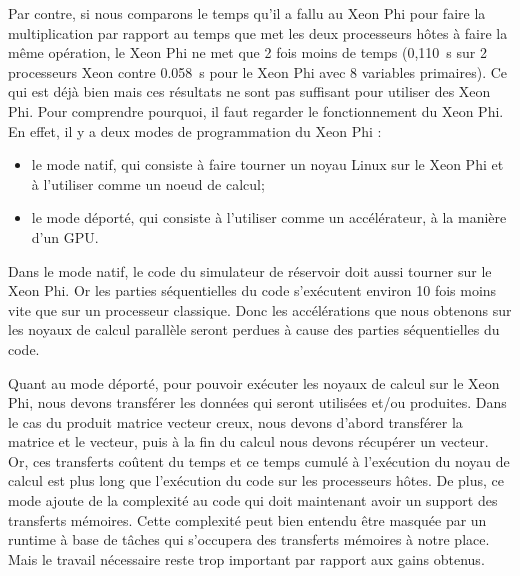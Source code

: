 Par contre, si nous comparons le temps qu'il a fallu au Xeon Phi pour faire la multiplication par rapport au temps que met les deux processeurs hôtes à faire la même opération, le Xeon Phi ne met que 2 fois moins de temps (0,110~s sur 2 processeurs Xeon contre 0.058~s pour le Xeon Phi avec 8 variables primaires).
%
Ce qui est déjà bien mais ces résultats ne sont pas suffisant pour utiliser des Xeon Phi.
%
Pour comprendre pourquoi, il faut regarder le fonctionnement du Xeon Phi.
%
En effet, il y a deux modes de programmation du Xeon Phi :
\begin{itemize}
    \item le mode natif, qui consiste à faire tourner un noyau Linux sur le Xeon Phi et à l'utiliser comme un noeud de calcul;
    \item le mode déporté, qui consiste à l'utiliser comme un accélérateur, à la manière d'un GPU.
\end{itemize}

Dans le mode natif, le code du simulateur de réservoir doit aussi tourner sur le Xeon Phi.
%
Or les parties séquentielles du code s'exécutent environ 10 fois moins vite que sur un processeur classique.
%
Donc les accélérations que nous obtenons sur les noyaux de calcul parallèle seront perdues à cause des parties séquentielles du code.


Quant au mode déporté, pour pouvoir exécuter les noyaux de calcul sur le Xeon Phi, nous devons transférer les données qui seront utilisées et/ou produites.
%
Dans le cas du produit matrice vecteur creux, nous devons d'abord transférer la matrice et le vecteur, puis à la fin du calcul nous devons récupérer un vecteur.
%
Or, ces transferts coûtent du temps et ce temps cumulé à l'exécution du noyau de calcul est plus long que l'exécution du code sur les processeurs hôtes.
%
De plus, ce mode ajoute de la complexité au code qui doit maintenant avoir un support des transferts mémoires.
%
Cette complexité peut bien entendu être masquée par un runtime à base de tâches qui s'occupera des transferts mémoires à notre place.
%
Mais le travail nécessaire reste trop important par rapport aux gains obtenus.
